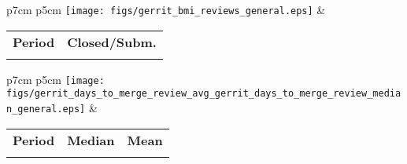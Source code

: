 \begin{tabular}{p{7cm} p{5cm}}
	\vspace{0pt} 
	\texttt{[image: figs/gerrit\_bmi\_reviews\_general.eps]}
	& 
	\vspace{0pt}
	\begin{tabular}{l|l}%
		\bfseries Period & \bfseries Closed/Subm. %
		\csvreader[head to column names]{data/gerrit_bmi_reviews_general.csv}{}%
		{\\ & \bmireviews}
	\end{tabular}
\end{tabular}




\begin{tabular}{p{7cm} p{5cm}}
	\vspace{0pt} 
	\texttt{[image: figs/gerrit\_days\_to\_merge\_review\_avg\_gerrit\_days\_to\_merge\_review\_median\_general.eps]}
	& 
	\vspace{0pt}
	\begin{tabular}{l|r|r|}%
		\bfseries Period & \bfseries Median & \bfseries Mean %
		\csvreader[head to column names]{data/gerrit_days_to_merge_review_avg_gerrit_days_to_merge_review_median_general.csv}{}%
		{\\ & \daystomergereviewmedian & \daystomergereviewavg}
	\end{tabular}
\end{tabular}